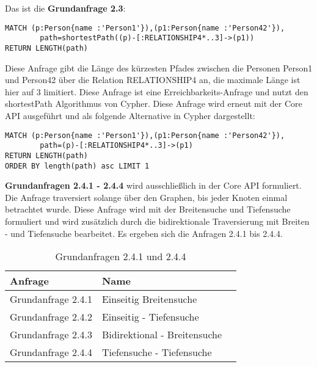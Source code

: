 Das ist die \textbf{Grundanfrage 2.3}: 
\begin{Verbatim}[frame=single]
MATCH (p:Person{name :'Person1'}),(p1:Person{name :'Person42'}),
		path=shortestPath((p)-[:RELATIONSHIP4*..3]->(p1)) 
RETURN LENGTH(path)
\end{Verbatim} 
Diese Anfrage gibt die Länge des kürzesten Pfades zwischen die Personen Person1 und Person42 über die Relation RELATIONSHIP4 an, die maximale Länge ist hier auf 3 limitiert. Diese Anfrage ist eine Erreichbarkeits-Anfrage und nutzt den shortestPath Algorithmus von Cypher. Diese Anfrage wird erneut mit der Core API ausgeführt und als folgende Alternative in Cypher dargestellt: 
\begin{Verbatim}[frame=single]
MATCH (p:Person{name :'Person1'}),(p1:Person{name :'Person42'}),
		path=(p)-[:RELATIONSHIP4*..3]->(p1) 
RETURN LENGTH(path)
ORDER BY length(path) asc LIMIT 1
\end{Verbatim}
 \textbf{Grundanfragen  2.4.1 - 2.4.4} wird ausschließlich in der Core API formuliert. \newline
Die Anfrage traversiert solange über den Graphen, bis jeder Knoten einmal betrachtet wurde. Diese Anfrage wird mit der Breitensuche und Tiefensuche formuliert und wird zusätzlich durch die bidirektionale Traversierung mit Breiten - und Tiefensuche bearbeitet. Es ergeben sich die Anfragen 2.4.1 bis 2.4.4. 
\FloatBarrier
\begin{table}[h]
	\centering
	\begin{tabular}{ |p{5cm}||p{5cm}|p{3cm}  }
		\hline
		Anfrage& Name\\
		\hline
		Grundanfrage 2.4.1 &  Einseitig Breitensuche\\
		Grundanfrage 2.4.2 &  Einseitig - Tiefensuche \\
		Grundanfrage 2.4.3 &  Bidirektional - Breitensuche\\
		Grundanfrage 2.4.4 &  Tiefensuche - Tiefensuche\\
		\hline
	\end{tabular}
	\caption{Grundanfragen 2.4.1 und 2.4.4}
	\label{tab:Intro_Query2_4}
\end{table}
\FloatBarrier
